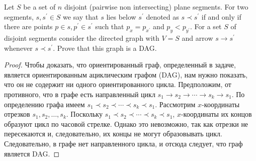 \begin{prob}
Let $S$ be a set of $n$ disjoint (pairwise non intersecting) plane segments. For two segments, $s, s^{\prime} \in S$ we say that $s$ lies below $s^{\prime}$ denoted as $s \prec s^{\prime}$ if and only if there are points $p \in s, p^{\prime} \in s^{\prime}$ such that $p_x=p_{x^{\prime}}$ and $p_y<p_{y^{\prime}}$. For a set $S$ of disjoint segments consider the directed graph with $V=S$ and arrow $s \rightarrow s^{\prime}$ whenever $s \prec s^{\prime}$. Prove that this graph is a DAG.
\end{prob}
\vskip 0.2in
\begin{proof}
Чтобы доказать, что ориентированный граф, определенный в задаче, является ориентированным ациклическим графом (DAG), нам нужно показать, что он не содержит ни одного ориентированного цикла.
\vskip 0.1in
Предположим, от противного, что в графе есть направленный цикл $s_1 \to s_2 \to \cdots \to s_k \to s_1$. По определению графа имеем $s_1 \prec s_2 \prec \cdots \prec s_k \prec s_1$.
\vskip 0.1in
Рассмотрим $x$-координаты отрезков $s_1, s_2, \ldots, s_k$. Поскольку $s_1 \prec s_2 \prec \cdots \prec s_k \prec s_1$, $x$-координаты их концов образуют цикл по часовой стрелке. Однако это невозможно, так как отрезки не пересекаются и, следовательно, их концы не могут образовывать цикл.
\vskip 0.1in
Следовательно, в графе нет направленного цикла, и отсюда следует, что граф является DAG.
\end{proof}

\begin{comment}
To prove that the directed graph defined in the problem is a directed acyclic graph (DAG), we need to show that it does not contain any directed cycle.
\vskip 0.1in
Suppose, for the sake of contradiction, that there is a directed cycle $s_1 \to s_2 \to \cdots \to s_k \to s_1$ in the graph. By the definition of the graph, we have $s_1 \prec s_2 \prec \cdots \prec s_k \prec s_1$.
\vskip 0.1in
Consider the $x$-coordinates of the segments $s_1, s_2, \ldots, s_k$. Since $s_1 \prec s_2 \prec \cdots \prec s_k \prec s_1$, the $x$-coordinates of their endpoints form a cycle in the clockwise direction. However, this is impossible since the segments are disjoint and hence their endpoints cannot form a cycle.
\vskip 0.1in
Therefore, there is no directed cycle in the graph, and it follows that the graph is a DAG.
\end{comment}
